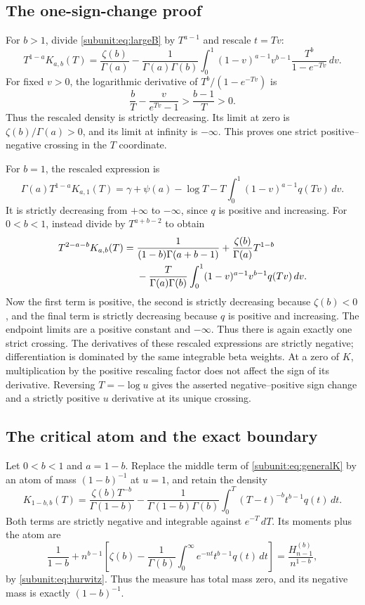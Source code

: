 \subsection{The one-sign-change proof}

For $b>1$, divide \eqref{subunit:eq:largeB} by $T^{a-1}$ and
rescale $t=Tv$:
\[
 T^{1-a}K_{a,b}(T)=\frac{\zeta(b)}{\Gamma(a)}
 -\frac1{\Gamma(a)\Gamma(b)}
  \int_0^1(1-v)^{a-1}v^{b-1}\frac{T^b}{1-e^{-Tv}}\,dv.
\]
For fixed $v>0$, the logarithmic derivative of
$T^b/(1-e^{-Tv})$ is
\[
 \frac bT-\frac{v}{e^{Tv}-1}>\frac{b-1}{T}>0.
\]
Thus the rescaled density is strictly decreasing. Its limit at zero is
$\zeta(b)/\Gamma(a)>0$, and its limit at infinity is $-\infty$.
This proves one strict positive--negative crossing in the $T$ coordinate.

For $b=1$, the rescaled expression is
\[
 \Gamma(a)T^{1-a}K_{a,1}(T)
 =\gamma+\psi(a)-\log T
  -T\int_0^1(1-v)^{a-1}q(Tv)\,dv.
\]
It is strictly decreasing from $+\infty$ to $-\infty$, since $q$ is
positive and increasing. For $0<b<1$, instead divide by
$T^{a+b-2}$ to obtain
\begin{align}\label{subunit:eq:rescaledLowB}
 T^{2-a-b}K_{a,b}(T)={}&
 \frac1{(1-b)\Gamma(a+b-1)}
 +\frac{\zeta(b)}{\Gamma(a)}T^{1-b}\notag\\
 &-\frac{T}{\Gamma(a)\Gamma(b)}
   \int_0^1(1-v)^{a-1}v^{b-1}q(Tv)\,dv.
\end{align}
Now the first term is positive, the second is strictly decreasing
because $\zeta(b)<0$, and the final term is strictly decreasing because
$q$ is positive and increasing. The endpoint limits are a positive
constant and $-\infty$. Thus there is again exactly one strict crossing.
The derivatives of these rescaled expressions are strictly negative;
differentiation is dominated by the same integrable beta weights.
At a zero of $K$, multiplication by the positive rescaling factor does
not affect the sign of its derivative. Reversing $T=-\log u$ gives
the asserted negative--positive sign change and a strictly positive
$u$ derivative at its unique crossing.

\subsection{The critical atom and the exact boundary}

Let $0<b<1$ and $a=1-b$. Replace the middle term of
\eqref{subunit:eq:generalK} by an atom of mass $(1-b)^{-1}$ at $u=1$,
and retain the density
\begin{equation}\label{subunit:eq:criticaldensity}
 K_{1-b,b}(T)=\frac{\zeta(b)T^{-b}}{\Gamma(1-b)}
 -\frac1{\Gamma(1-b)\Gamma(b)}
   \int_0^T(T-t)^{-b}t^{b-1}q(t)\,dt.
\end{equation}
Both terms are strictly negative and integrable against $e^{-T}\,dT$.
Its moments plus the atom are
\[
 \frac1{1-b}+n^{b-1}\left[\zeta(b)
   -\frac1{\Gamma(b)}\int_0^\infty e^{-nt}t^{b-1}q(t)\,dt\right]
 =\frac{H_{n-1}^{(b)}}{n^{1-b}},
\]
by \eqref{subunit:eq:hurwitz}. Thus the measure has total mass zero,
and its negative mass is exactly $(1-b)^{-1}$.

